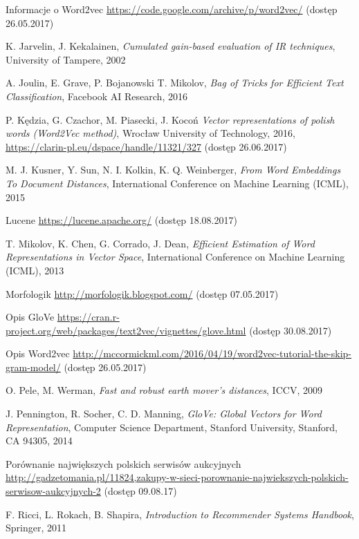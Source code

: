 \documentclass[pl]{minipw} %
\begin{document}
\begin{thebibliography}{30}
		Informacje o Word2vec
		\url{https://code.google.com/archive/p/word2vec/}
		(dostęp 26.05.2017)
	
		K. Jarvelin, J. Kekalainen,
		\emph{Cumulated gain-based evaluation of IR techniques},
		University of Tampere,
		2002
	
		A. Joulin, E. Grave, P. Bojanowski T. Mikolov,
		\emph{Bag of Tricks for Efficient Text Classification},
		Facebook AI Research,
		2016
	
		P. Kędzia, G. Czachor, M. Piasecki, J. Kocoń
		\emph{Vector representations of polish words (Word2Vec method)},
		Wrocław University of Technology,
		2016,
		\url{https://clarin-pl.eu/dspace/handle/11321/327}
		(dostęp 26.06.2017)
	
		M. J. Kusner, Y. Sun, N. I. Kolkin, K. Q. Weinberger,
		\emph{From Word Embeddings To Document Distances},
		International Conference on Machine Learning (ICML),
		2015
	
		Lucene
		\url{https://lucene.apache.org/}
		(dostęp 18.08.2017)
	
		T. Mikolov, K. Chen, G. Corrado, J. Dean,
		\emph{Efficient Estimation of Word Representations in Vector Space},
		International Conference on Machine Learning (ICML),
		2013
	
		Morfologik
		\url{http://morfologik.blogspot.com/}
		(dostęp 07.05.2017)
	
		Opis GloVe
		\url{https://cran.r-project.org/web/packages/text2vec/vignettes/glove.html}
		(dostęp 30.08.2017)
	
		Opis Word2vec
		\url{http://mccormickml.com/2016/04/19/word2vec-tutorial-the-skip-gram-model/}
		(dostęp 26.05.2017)
	
		O. Pele, M. Werman,
		\emph{Fast and robust earth mover's distances},
		ICCV,
		2009
	
		J. Pennington, R. Socher, C. D. Manning,
		\emph{GloVe: Global Vectors for Word Representation},
		Computer Science Department, Stanford University, Stanford, CA 94305,
		2014
	
		Porównanie największych polskich serwisów aukcyjnych
		\url{http://gadzetomania.pl/11824,zakupy-w-sieci-porownanie-najwiekszych-polskich-serwisow-aukcyjnych-2}
		(dostęp 09.08.17)
	
		F. Ricci, L. Rokach, B. Shapira,
		\emph{Introduction to Recommender Systems Handbook},
		Springer,
		2011
	

\end{thebibliography}
\end{document}
